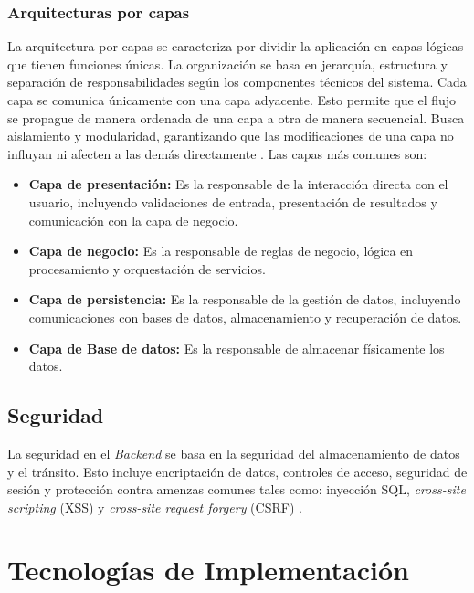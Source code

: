 \subsubsection{Arquitecturas por capas}
La arquitectura por capas se caracteriza por dividir la aplicación en capas lógicas que tienen funciones únicas. La organización
se basa en jerarquía, estructura y separación de responsabilidades según los componentes técnicos del sistema. Cada capa se comunica
únicamente con una capa adyacente. Esto permite que el flujo se propague de manera ordenada de una capa a otra de manera secuencial.
Busca aislamiento y modularidad, garantizando que las modificaciones de una capa no influyan ni afecten a las demás directamente
\cite{richards2021fundamentalsSoftwareArchitecture}.
Las capas más comunes son:
\begin{itemize}
    \item \textbf{Capa de presentación:} Es la responsable de la interacción directa con el usuario, incluyendo validaciones de entrada,
            presentación de resultados y comunicación con la capa de negocio.
    \item \textbf{Capa de negocio:} Es la responsable de reglas de negocio, lógica en procesamiento y orquestación de servicios.
    \item \textbf{Capa de persistencia:} Es la responsable de la gestión de datos, incluyendo comunicaciones con bases de datos, almacenamiento
            y recuperación de datos.
    \item \textbf{Capa de Base de datos:} Es la responsable de almacenar físicamente los datos.
\end{itemize}

\subsection{Seguridad}
La seguridad en el \textit{Backend} se basa en la seguridad del almacenamiento de datos y el tránsito. Esto incluye
encriptación de datos, controles de acceso, seguridad de sesión y protección contra amenzas comunes tales como: 
inyección SQL, \textit{cross-site scripting} (XSS) y \textit{cross-site request forgery} (CSRF) \cite{aws2025frontendBackend}.

\section{Tecnologías de Implementación}

